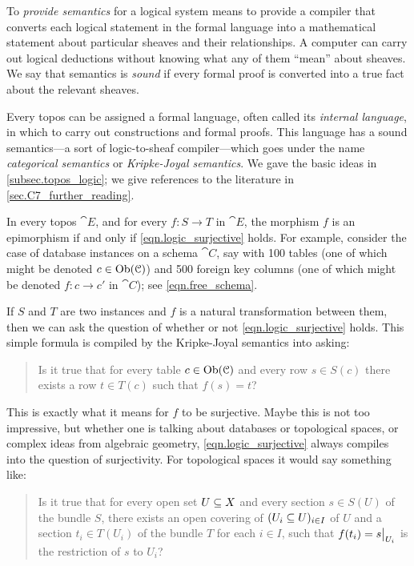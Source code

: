 \documentclass[7Sketches]{subfiles}
\begin{document}
To \emph{provide semantics} for a logical system means to provide a compiler that converts each logical statement in the formal language into a mathematical statement about particular sheaves and their relationships. A computer can carry out logical deductions without knowing what any of them ``mean'' about sheaves. We say that semantics is \emph{sound} if every formal proof is converted into a true fact about the relevant sheaves.%

Every topos can be assigned a formal language, often called its \emph{internal
language}, in which to carry out constructions and formal proofs. This language
has a sound semantics---a sort of logic-to-sheaf compiler---which goes under the name \emph{categorical semantics} or \emph{Kripke-Joyal semantics}. We gave the basic ideas in \cref{subsec.topos_logic}; we give references to the literature in \cref{sec.C7_further_reading}.%

\begin{example}
In every topos $\cat{E}$, and for every $f\colon S\to T$ in $\cat{E}$, the morphism $f$ is an epimorphism if and only if \cref{eqn.logic_surjective} holds. For example, consider the case of database instances on a schema $\cat{C}$, say with 100 tables (one of which might be denoted $c\in\Ob(\cat{C})$) and 500 foreign key columns (one of which might be denoted $f\colon c\to c'$ in $\cat{C}$); see \cref{eqn.free_schema}.

If $S$ and $T$ are two instances and $f$ is a natural transformation between them, then we can ask the question of whether or not \cref{eqn.logic_surjective} holds. This simple formula is compiled by the Kripke-Joyal semantics into asking:
\begin{quote}
	Is it true that for every table $c\in\Ob(\cat{C})$ and every row $s\in S(c)$ there exists a row $t\in T(c)$ such that $f(s)=t$?
\end{quote}
This is exactly what it means for $f$ to be surjective. Maybe this is not too impressive, but whether one is talking about databases or topological spaces, or complex ideas from algebraic geometry, \cref{eqn.logic_surjective} always compiles into the question of surjectivity. For topological spaces it would say something like:
\begin{quote}
	Is it true that for every open set $U\ss X$ and every section $s\in S(U)$ of the bundle $S$, there exists an open covering of $(U_i\ss U)_{i\in I}$ of $U$ and a section $t_i\in T(U_i)$ of the bundle $T$ for each $i\in I$, such that $f(t_i)=\restrict{s}{U_i}$ is the restriction of $s$ to $U_i$?
\end{quote}
\end{example}
\end{document}
